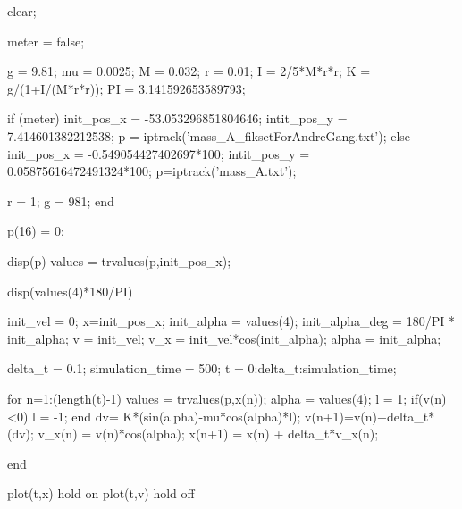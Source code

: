 clear;

meter  = false; 

g = 9.81;
mu = 0.0025;
M = 0.032;
r = 0.01;
I = 2/5*M*r*r;
K = g/(1+I/(M*r*r));
PI = 3.141592653589793;


if (meter)
    init_pos_x = -53.053296851804646; %
    intit_pos_y = 7.414601382212538; %
    p = iptrack('mass_A_fiksetForAndreGang.txt');
else %
    init_pos_x = -0.549054427402697*100; %
    intit_pos_y = 0.05875616472491324*100; %
    p=iptrack('mass_A.txt');
    
    r = 1; 
    g = 981; 
end

p(16) = 0;

disp(p)
values = trvalues(p,init_pos_x);

disp(values(4)*180/PI)

init_vel = 0;
x=init_pos_x;
init_alpha = values(4);
init_alpha_deg = 180/PI * init_alpha; 
v = init_vel;
v_x = init_vel*cos(init_alpha);
alpha = init_alpha; 

delta_t = 0.1;
simulation_time = 500; 
t = 0:delta_t:simulation_time;

for n=1:(length(t)-1)
    values = trvalues(p,x(n));
    alpha = values(4);
    l = 1;
    if(v(n)<0)
        l = -1;
    end
    dv= K*(sin(alpha)-mu*cos(alpha)*l);
    v(n+1)=v(n)+delta_t*(dv);
    v_x(n) = v(n)*cos(alpha);
    x(n+1) = x(n) + delta_t*v_x(n);
    
    
end

plot(t,x)
hold on
plot(t,v)
hold off 

